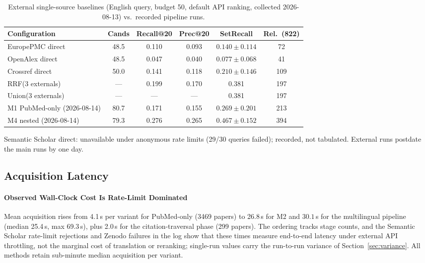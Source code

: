 \documentclass[sigconf,screen]{acmart}
\begin{document}
\begin{table}[t]
\centering
\small
\setlength{\tabcolsep}{3.6pt}
\begin{threeparttable}
\caption{External single-source baselines (English query, budget 50,
default API ranking, collected 2026-08-13) vs.\ recorded pipeline runs.}
\label{tab:external}
\footnotesize
\begin{tabular}{@{}lccccc@{}}
\toprule
Configuration & Cands & Recall@20 & Prec@20 & SetRecall & Rel.\ (822) \\
\midrule
EuropePMC direct & 48.5 & 0.110 & 0.093 & $0.140\pm0.114$ & 72 \\
OpenAlex direct & 48.5 & 0.047 & 0.040 & $0.077\pm0.068$ & 41 \\
Crossref direct & 50.0 & 0.141 & 0.118 & $0.210\pm0.146$ & 109 \\
RRF(3 externals) & --- & 0.199 & 0.170 & 0.381 & 197 \\
Union(3 externals) & --- & --- & --- & 0.381 & 197 \\
\midrule
M1 PubMed-only (2026-08-14) & 80.7 & 0.171 & 0.155 & $0.269\pm0.201$ & 213 \\
M4 nested (2026-08-14) & 79.3 & 0.276 & 0.265 & $0.467\pm0.152$ & 394 \\
\bottomrule
\end{tabular}
\begin{tablenotes}
\item Semantic Scholar direct: unavailable under anonymous rate limits
(29/30 queries failed); recorded, not tabulated. External runs postdate
the main runs by one day.
\end{tablenotes}
\end{threeparttable}
\end{table}

\subsection{Acquisition Latency}
\label{sec:latency}

\paragraph{Observed Wall-Clock Cost Is Rate-Limit Dominated}
Mean acquisition rises from 4.1\,s per variant for PubMed-only (3469
papers) to 26.8\,s for M2 and $30.1$\,s for the multilingual pipeline
(median 25.4\,s, max 69.3\,s), plus 2.0\,s for the citation-traversal
phase (299 papers). The ordering tracks stage counts, and the Semantic
Scholar rate-limit rejections and Zenodo failures in the log show that
these times measure end-to-end latency under external API throttling, not
the marginal cost of translation or reranking; single-run values carry
the run-to-run variance of Section~\ref{sec:variance}. All methods retain
sub-minute median acquisition per variant.
\end{document}
